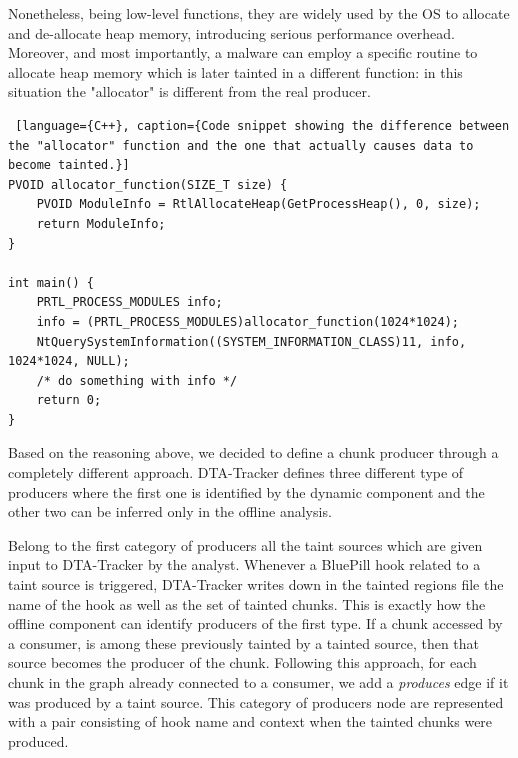 \documentclass[LaM,binding=0.6cm]{sapthesis}
\begin{document}
Nonetheless, being low-level functions, they are widely used by the OS to allocate and de-allocate heap memory, introducing serious performance overhead. Moreover, and most importantly, a malware can employ a specific routine to allocate heap memory which is later tainted in a different function: in this situation the "allocator" is different from the real producer.

\begin{lstlisting} [language={C++}, caption={Code snippet showing the difference between the "allocator" function and the one that actually causes data to become tainted.}]
PVOID allocator_function(SIZE_T size) {
	PVOID ModuleInfo = RtlAllocateHeap(GetProcessHeap(), 0, size);
	return ModuleInfo;
}

int main() {
	PRTL_PROCESS_MODULES info;
	info = (PRTL_PROCESS_MODULES)allocator_function(1024*1024);
	NtQuerySystemInformation((SYSTEM_INFORMATION_CLASS)11, info, 1024*1024, NULL);
	/* do something with info */
	return 0;
}
\end{lstlisting}

\noindent
Based on the reasoning above, we decided to define a chunk producer through a completely different approach. {\sf DTA-Tracker} defines three different type of producers where the first one is identified by the dynamic component and the other two can be inferred only in the offline analysis.

Belong to the first category of producers all the taint sources which are given input to {\sf DTA-Tracker} by the analyst. Whenever a BluePill hook related to a taint source is triggered, {\sf DTA-Tracker} writes down in the tainted regions file the name of the hook as well as the set of tainted chunks. This is exactly how the offline component can identify producers of the first type. If a chunk accessed by a consumer, is among these previously tainted by a tainted source, then that source becomes the producer of the chunk. Following this approach, for each chunk in the graph already connected to a consumer, we add a \textit{produces} edge if it was produced by a taint source. This category of producers node are represented with a pair consisting of hook name and context when the tainted chunks were produced.\\
\end{document}
